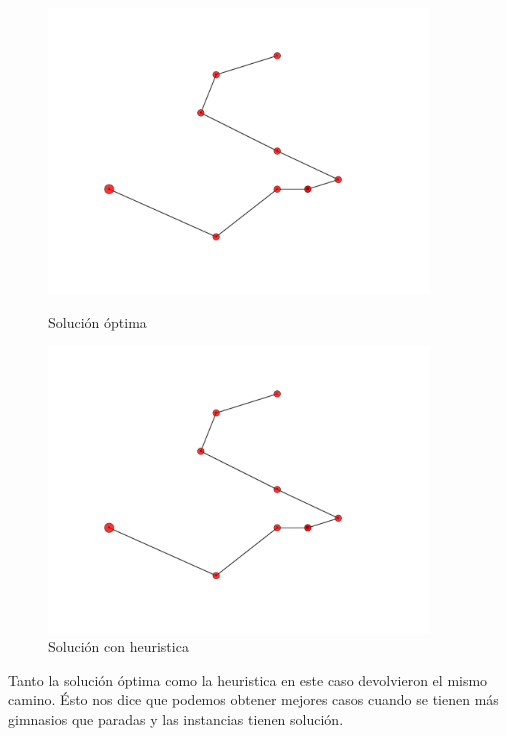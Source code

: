 \begin{figure}[H]
\centering
\begin{minipage}{0.45\textwidth}
\centering
\includegraphics[width=0.9\textwidth]{imagenes/test3-soltest3BT.pdf}
\caption{Solución óptima}
\label{fig:ej2_caso3bt}
\end{minipage}
\qquad
\begin{minipage}{0.45\textwidth}
\centering
\includegraphics[width=0.9\textwidth]{imagenes/test3-soltest3H.pdf}
\caption{Solución con heuristica}
\label{fig:ej2_caso3h}
\end{minipage}
\end{figure}

Tanto la solución óptima como la heuristica en este caso devolvieron el mismo camino. Ésto nos dice que podemos obtener mejores casos cuando se tienen más gimnasios que paradas y las instancias tienen solución.


